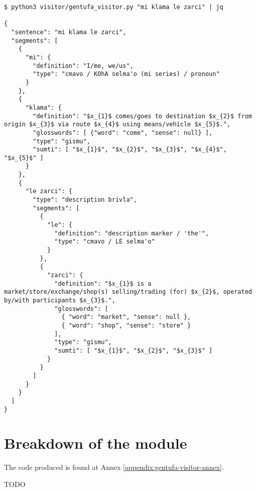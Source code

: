 \newpage

\begin{lstlisting}[caption=GentufaVisitor module being used as a command-line interface tool]
$ python3 visitor/gentufa_visitor.py "mi klama le zarci" | jq

{
  "sentence": "mi klama le zarci",
  "segments": [
    {
      "mi": {
        "definition": "I/me, we/us",
        "type": "cmavo / KOhA selma'o (mi series) / pronoun"
      }
    },
    {
      "klama": {
        "definition": "$x_{1}$ comes/goes to destination $x_{2}$ from origin $x_{3}$ via route $x_{4}$ using means/vehicle $x_{5}$.",
        "glosswords": [ {"word": "come", "sense": null} ],
        "type": "gismu",
        "sumti": [ "$x_{1}$", "$x_{2}$", "$x_{3}$", "$x_{4}$", "$x_{5}$" ]
      }
    },
    {
      "le zarci": {
        "type": "description brivla",
        "segments": [
          {
            "le": {
              "definition": "description marker / 'the'",
              "type": "cmavo / LE selma'o"
            }
          },
          {
            "zarci": {
              "definition": "$x_{1}$ is a market/store/exchange/shop(s) selling/trading (for) $x_{2}$, operated by/with participants $x_{3}$.",
              "glosswords": [
                { "word": "market", "sense": null },
                { "word": "shop", "sense": "store" }
              ],
              "type": "gismu",
              "sumti": [ "$x_{1}$", "$x_{2}$", "$x_{3}$" ]
            }
          }
        ]
      }
    }
  ]
}
\end{lstlisting}

\section{Breakdown of the module}
\label{sec:visitor-code-breakdown}

The code produced is found at Annex \ref{appendix:gentufa-visitor-annex}.

TODO